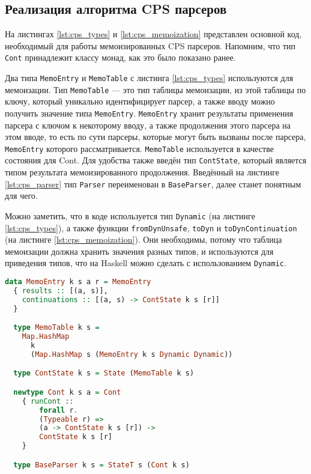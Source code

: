 \documentclass[times]{itmo-student-thesis}
\begin{document}
\subsection{Реализация алгоритма CPS парсеров}

На листингах \ref{lst:cps_types} и \ref{lst:cps_memoization} представлен основной код, необходимый для работы мемоизированных CPS парсеров. Напомним,
что тип \lstinline{Cont} принадлежит классу монад, как это было показано ранее.

Два типа \lstinline{MemoEntry} и \lstinline{MemoTable} с листинга \ref{lst:cps_types} используются для мемоизации.
Тип \lstinline{MemoTable} --- это тип таблицы мемоизации, из этой таблицы по ключу, который уникально идентифицирует
парсер, а также вводу можно получить значение типа \lstinline{MemoEntry}. \lstinline{MemoEntry} хранит результаты
применения парсера с ключом к некоторому вводу, а также продолжения этого парсера на этом вводе, то есть по сути
парсеры, которые могут быть вызваны после парсера,
\lstinline{MemoEntry} которого рассматривается. \lstinline{MemoTable} используется в качестве состояния для Cont. Для
удобства также введён тип \lstinline{ContState}, который является типом результата мемоизированного продолжения.
Введённый на листинге \ref{lst:cps_parser} тип \lstinline{Parser} переименован в \lstinline{BaseParser}, далее станет
понятным для чего.

Можно заметить, что в коде используется тип \lstinline{Dynamic} (на листинге \ref{lst:cps_types}), а также функции
\lstinline{fromDynUnsafe}, \lstinline{toDyn} и \lstinline{toDynContinuation} (на листинге \ref{lst:cps_memoization}).
Они необходимы, потому что таблица мемоизации должна хранить значения разных типов, и используются для приведения
типов, что на Haskell можно сделать с использованием \lstinline{Dynamic}\cite{noauthor_datadynamic_nodate}.

\begin{lstlisting}[language=Haskell,float=!h,caption={Типы для CPS парсера},label={lst:cps_types}]
  data MemoEntry k s a r = MemoEntry
  { results :: [(a, s)],
    continuations :: [(a, s) -> ContState k s [r]]
  }

  type MemoTable k s =
    Map.HashMap
      k
      (Map.HashMap s (MemoEntry k s Dynamic Dynamic))

  type ContState k s = State (MemoTable k s)

  newtype Cont k s a = Cont
    { runCont ::
        forall r.
        (Typeable r) =>
        (a -> ContState k s [r]) ->
        ContState k s [r]
    }

  type BaseParser k s = StateT s (Cont k s)
\end{lstlisting}
\end{document}
